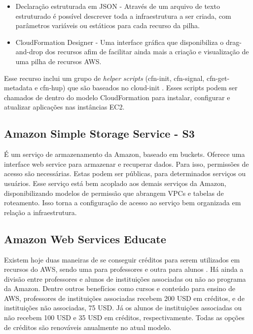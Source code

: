 \documentclass[tg]{mdtufsm}
\begin{document}
\begin{itemize}
\item{Declaração estruturada em JSON} - Através de um arquivo de texto estruturado é possível descrever toda a infraestrutura a ser criada, com parâmetros variáveis ou estáticos para cada recurso da pilha.

\item{CloudFormation Designer} - Uma interface gráfica que disponibiliza o drag-and-drop dos recursos afim de facilitar ainda mais a criação e visualização de uma pilha de recursos AWS.
\end{itemize}

Esse recurso inclui um grupo de \emph{helper scripts} (cfn-init, cfn-signal, cfn-get-metadata e cfn-hup) que são baseados no cloud-init \cite{awsinit}. Esses scripts podem ser chamados de dentro do modelo CloudFormation para instalar, configurar e atualizar aplicações nas instâncias EC2.

\subsection{Amazon Simple Storage Service - S3}

É um serviço de armazenamento da Amazon, baseado em buckets. Oferece uma interface web service para armazenar e recuperar dados. Para isso, permissões de acesso são necessárias. Estas podem ser públicas, para determinados serviços ou usuários. Esse serviço está bem acoplado aos demais serviços da Amazon, disponibilizando modelos de permissão que abrangem VPCs e tabelas de roteamento. Isso torna a configuração de acesso ao serviço bem organizada em relação a infraestrutura.

\subsection{Amazon Web Services Educate}

Existem hoje duas maneiras de se conseguir créditos para serem utilizados em recursos do AWS, sendo uma para professores e outra para alunos \cite{awsedu}. Há ainda a divisão entre professores e alunos de instituições associadas ou não ao programa da Amazon. Dentre outros benefícios como cursos e conteúdo para ensino de AWS, professores de instituições associadas recebem 200 USD em créditos, e de instituições não associadas, 75 USD. Já os alunos de instituições associadas ou não recebem 100 USD e 35 USD em créditos, respectivamente. Todas as opções de créditos são renováveis anualmente no atual modelo.
\end{document}
